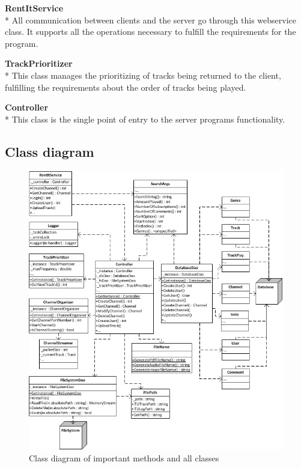 \documentclass[a4paper,11pt,report]{article}
\begin{document}
\textbf{RentItService} \\*
All communication between clients and the server go through this webservice class. It supports all the operations necessary to fulfill the requirements for the program. 

\textbf{TrackPrioritizer} \\*
This class manages the prioritizing of tracks being returned to the client, fulfilling the requirements about the order of tracks being played.

\textbf{Controller} \\*
This class is the single point of entry to the server programs functionality.

\newpage
\subsection{Class diagram}
\begin{figure}[H]
  \centering
\includegraphics[]{./ClassDiagram.png}
\caption{Class diagram of important methods and all classes}
\end{figure}
\end{document}
